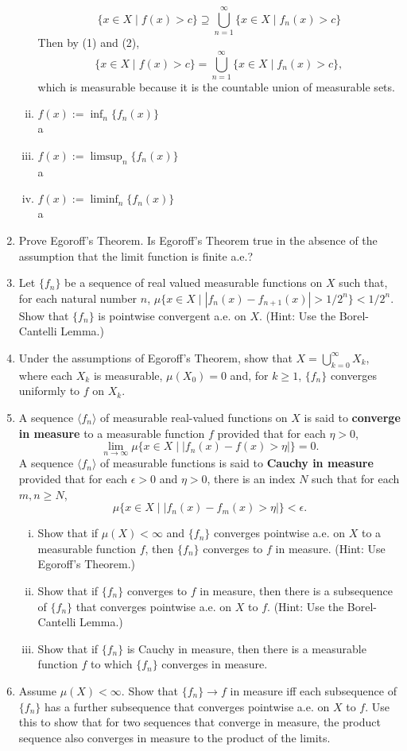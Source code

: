\begin{enumerate}
\begin{enumerate}[(i)]
        \[
            \{x\in X\mid f(x)>c\}\supseteq\bigcup_{n=1}^\infty\{x\in X\mid f_n(x)>c\}\tag{2}
        \]
        Then by (1) and (2),
        \[
            \{x\in X\mid f(x)>c\}=\bigcup_{n=1}^\infty\{x\in X\mid f_n(x)>c\},
        \]
        which is measurable because it is the countable union of measurable sets.
        \item $f(x):=\inf_n\{f_n(x)\}$
        \\a
        \item $f(x):=\limsup_n\{f_n(x)\}$
        \\a
        \item $f(x):=\liminf_n\{f_n(x)\}$
        \\a
    \end{enumerate}
    \item Prove Egoroff's Theorem.
    Is Egoroff's Theorem true in the absence of the assumption that the limit function is finite a.e.?
    \item Let $\{f_n\}$ be a sequence of real valued measurable functions on $X$ such that, for each natural number $n$, $\mu\{x\in X\mid |f_n(x)-f_{n+1}(x)|>1/2^n\}<1/2^n$.
    Show that $\{f_n\}$ is pointwise convergent a.e. on $X$. 
    (Hint: Use the Borel-Cantelli Lemma.)
    \item Under the assumptions of Egoroff's Theorem, show that $X=\bigcup_{k=0}^\infty X_k$, where each $X_k$ is measurable, $\mu(X_0)=0$ and, for $k\ge1$, $\{f_n\}$ converges uniformly to $f$ on $X_k$.
    \item A sequence $\langle f_n\rangle$ of measurable real-valued functions on $X$ is said to \textbf{converge in measure} to a measurable function $f$ provided that for each $\eta>0$,
    \[
        \lim_{n\to\infty}\mu\{x\in X\mid|f_n(x)-f(x)>\eta|\}=0.
    \]
    A sequence $\langle f_n\rangle$ of measurable functions is said to \textbf{Cauchy in measure} provided that for each $\epsilon>0$ and $\eta>0$, there is an index $N$ such that for each $m,n\ge N$,
    \[
        \mu\{x\in X\mid|f_n(x)-f_m(x)>\eta|\}<\epsilon.
    \]
    \begin{enumerate}[(i)]
        \item Show that if $\mu(X)<\infty$ and $\{f_n\}$ converges pointwise a.e. on $X$ to a measurable function $f$, then $\{f_n\}$ converges to $f$ in measure.
        (Hint: Use Egoroff's Theorem.)
        \item Show that if $\{f_n\}$ converges to $f$ in measure, then there is a subsequence of $\{f_n\}$ that converges pointwise a.e. on $X$ to $f$.
        (Hint: Use the Borel-Cantelli Lemma.)
        \item Show that if $\{f_n\}$ is Cauchy in measure, then there is a measurable function $f$ to which $\{f_n\}$ converges in measure.
    \end{enumerate}
    \item Assume $\mu(X)<\infty$.
    Show that $\{f_n\}\to f$ in measure iff each subsequence of $\{f_n\}$ has a further subsequence that converges pointwise a.e. on $X$ to $f$.
    Use this to show that for two sequences that converge in measure, the product sequence also converges in measure to the product of the limits.
\end{enumerate}

